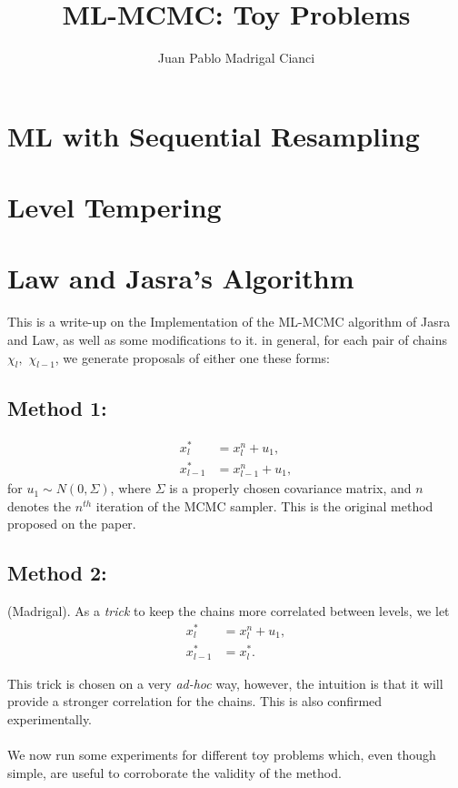 \documentclass[a4paper]{article}
\title{\textbf{ML-MCMC: Toy Problems}}
\author{Juan Pablo Madrigal Cianci}
\begin{document}
\maketitle
\section{ML with Sequential Resampling}

\section{Level Tempering}
\section{Law and Jasra's Algorithm}
This is a write-up  on the Implementation of the ML-MCMC algorithm of Jasra and Law, as well as some modifications to it. in general,  for each pair of chains $\chi_l,$ $\chi_{l-1}$, we generate proposals of either one these forms:
\subsection{Method 1:} 
	\begin{align}
x_l^*&=x^n_l+u_1,\\
x^*_{l-1}&= x^n_{l-1}+u_1,
	\end{align}
	for $u_1\sim N(0,\Sigma)$, where $\Sigma$ is a properly chosen covariance matrix, and $n$ denotes the $n^{th}$ iteration of the MCMC sampler. This is the original method proposed on the paper.
\subsection{Method 2:} (Madrigal). As a \textit{trick} to keep the chains more correlated between levels, we let 
	\begin{align}
x_l^*&=x^n_l+u_1,\\
x^*_{l-1}&= x^*_{l}.
\end{align}

This trick is chosen on a very \textit{ad-hoc} way, however, the intuition is that it will provide a stronger correlation for the chains. This is also confirmed experimentally.\\
\\
We now run some experiments for different toy problems which, even though simple, are useful to corroborate the validity of the method.
\end{document}
